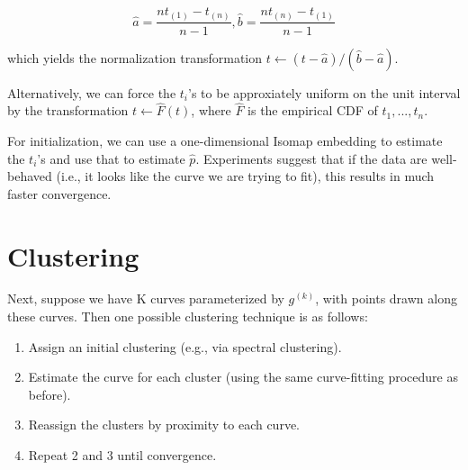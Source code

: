 \documentclass[
  11pt,
]{article}
\providecommand{\tightlist}{%
  \setlength{\itemsep}{0pt}\setlength{\parskip}{0pt}}
\begin{document}
\[\hat{a} = \frac{n t_{(1)} - t_{(n)}}{n - 1},
\hat{b} = \frac{n t_{(n)} - t_{(1)}}{n - 1}\]

which yields the normalization transformation
\(t \leftarrow (t - \hat{a}) / (\hat{b} - \hat{a})\).

Alternatively, we can force the \(t_i\)'s to be approxiately uniform on
the unit interval by the transformation \(t \leftarrow \hat{F}(t)\),
where \(\hat{F}\) is the empirical CDF of \(t_1, ..., t_n\).

For initialization, we can use a one-dimensional Isomap embedding to
estimate the \(t_i\)'s and use that to estimate \(\hat{p}\). Experiments
suggest that if the data are well-behaved (i.e., it looks like the curve
we are trying to fit), this results in much faster convergence.

\hypertarget{clustering}{%
\section{Clustering}\label{clustering}}

Next, suppose we have K curves parameterized by \(g^{(k)}\), with points
drawn along these curves. Then one possible clustering technique is as
follows:

\begin{enumerate}
\def\labelenumi{\arabic{enumi}.}
\tightlist
\item
  Assign an initial clustering (e.g., via spectral clustering).
\item
  Estimate the curve for each cluster (using the same curve-fitting
  procedure as before).
\item
  Reassign the clusters by proximity to each curve.
\item
  Repeat 2 and 3 until convergence.
\end{enumerate}
\end{document}
